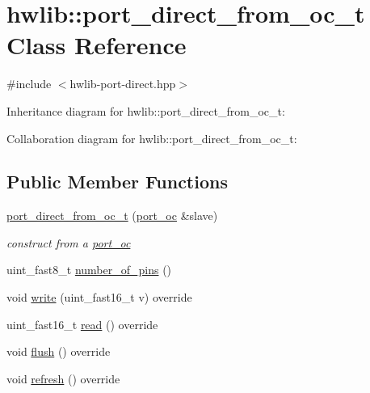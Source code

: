 \hypertarget{classhwlib_1_1port__direct__from__oc__t}{}\section{hwlib\+:\+:port\+\_\+direct\+\_\+from\+\_\+oc\+\_\+t Class Reference}
\label{classhwlib_1_1port__direct__from__oc__t}


{\ttfamily \#include $<$hwlib-\/port-\/direct.\+hpp$>$}



Inheritance diagram for hwlib\+:\+:port\+\_\+direct\+\_\+from\+\_\+oc\+\_\+t\+:


Collaboration diagram for hwlib\+:\+:port\+\_\+direct\+\_\+from\+\_\+oc\+\_\+t\+:
\subsection*{Public Member Functions}
\begin{DoxyCompactItemize}
\item 
\mbox{\label{classhwlib_1_1port__direct__from__oc__t_ab8a414a810b789bc53f21cd416157df8}} 
\hyperlink{classhwlib_1_1port__direct__from__oc__t_ab8a414a810b789bc53f21cd416157df8}{port\+\_\+direct\+\_\+from\+\_\+oc\+\_\+t} (\hyperlink{classhwlib_1_1port__oc}{port\+\_\+oc} \&slave)
\begin{DoxyCompactList}\small\item\em construct from a \hyperlink{classhwlib_1_1port__oc}{port\+\_\+oc} \end{DoxyCompactList}\item 
uint\+\_\+fast8\+\_\+t \hyperlink{classhwlib_1_1port__direct__from__oc__t_aabab920072e42dcf903cb218f312f2da}{number\+\_\+of\+\_\+pins} ()
\item 
void \hyperlink{classhwlib_1_1port__direct__from__oc__t_ab420ae508634aa891cb699f1e9972616}{write} (uint\+\_\+fast16\+\_\+t v) override
\item 
uint\+\_\+fast16\+\_\+t \hyperlink{classhwlib_1_1port__direct__from__oc__t_a159e337f1ffbf3dc5ffd5173172577b3}{read} () override
\item 
void \hyperlink{classhwlib_1_1port__direct__from__oc__t_a3fe125af1f9ce2a5db5aa01b20c4d92e}{flush} () override
\item 
void \hyperlink{classhwlib_1_1port__direct__from__oc__t_a9144abbeca4e68f016bbfea05395d039}{refresh} () override
\end{DoxyCompactItemize}


